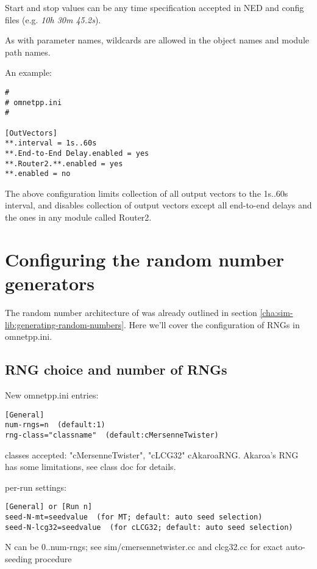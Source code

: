 Start and stop values can be any time specification accepted
in NED and config files (e.g. \textit{10h 30m 45.2s}).

As with parameter names, wildcards are allowed in the object
names and module path names.

An example:

\begin{verbatim}
#
# omnetpp.ini
#

[OutVectors]
**.interval = 1s..60s
**.End-to-End Delay.enabled = yes
**.Router2.**.enabled = yes
**.enabled = no
\end{verbatim}


The above configuration limits collection of all output vectors
to the 1s..60s interval, and disables collection of output vectors
except all end-to-end delays and the ones in any module called Router2.


\section{Configuring the random number generators}
\label{sec:ch-run-sim:rng-config}

The random number architecture of {\opp} was already outlined
in section \ref{cha:sim-lib:generating-random-numbers}. Here
we'll cover the configuration of RNGs in omnetpp.ini.

\subsection{RNG choice and number of RNGs}

New omnetpp.ini entries:

\begin{verbatim}
[General]
num-rngs=n  (default:1)
rng-class="classname"  (default:cMersenneTwister)
\end{verbatim}

classes accepted: "cMersenneTwister", "cLCG32"
cAkaroaRNG. Akaroa's RNG has some limitations, see class
doc for details.

per-run settings:

\begin{verbatim}
[General] or [Run n]
seed-N-mt=seedvalue  (for MT; default: auto seed selection)
seed-N-lcg32=seedvalue  (for cLCG32; default: auto seed selection)
\end{verbatim}

N can be 0..num-rngs; see sim/cmersennetwister.cc and clcg32.cc for
exact auto-seeding procedure



